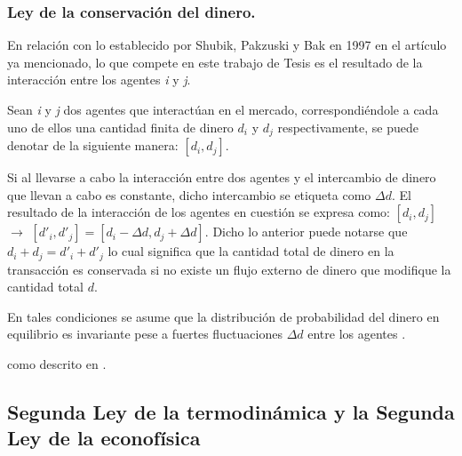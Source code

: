 \subsubsection{Ley de la conservación del dinero.} 

En relación con lo establecido por Shubik, Pakzuski y Bak en 1997 en el artículo ya mencionado, lo que compete en este trabajo de Tesis es el resultado de la interacción entre los agentes \textit{i} y \textit{j}. 

Sean \textit{i} y \textit{j} dos agentes que interactúan en el mercado, correspondiéndole a cada uno de ellos una cantidad finita de dinero $d_{i}$ y $d_{j}$ respectivamente, se puede denotar de la siguiente manera: $[d_{i},d_{j}]$. 

Si al llevarse a cabo la interacción entre dos agentes y el intercambio de dinero que llevan a cabo es constante, dicho intercambio se etiqueta como $\Delta d$. El resultado de la interacción de los agentes en cuestión se expresa como:  $[d_{i},d_{j}]$ $\longrightarrow$  $[d'_{i},d'_{j}] = [d_{i} - \Delta d ,d_{j} + \Delta d]$. Dicho lo anterior puede notarse que $d_{i} + d_{j} = d'_{i} + d'_{j}$ lo cual significa que la cantidad total de dinero en la transacción es conservada si no existe un flujo externo de dinero que modifique la cantidad total $d$.

En tales condiciones se asume que la distribución de probabilidad del dinero en equilibrio es invariante pese a fuertes fluctuaciones $\Delta d$ entre los agentes \citep[][pagina 149]{cottrell_classical_2009}.



como descrito en \citep{Huang2021}.



\subsection{Segunda Ley de la termodinámica y la Segunda Ley de la econofísica} 


%

